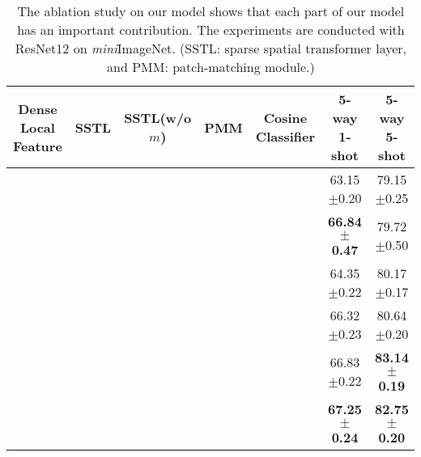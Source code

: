 \documentclass{SCIS2019}
\begin{document}
\begin{table}[t]
	\centering
	\caption{The ablation study on our model shows that each part of our model has an important contribution. The experiments are conducted with ResNet12 on \emph{mini}ImageNet. (SSTL: sparse spatial transformer layer, and PMM: patch-matching module.)}
	\begin{tabular*}{\hsize}{@{}@{\extracolsep{\fill}}ccccccc@{}}
\toprule
			\label{ablation}
			Dense Local Feature&SSTL&SSTL(w/o $m$)&PMM& Cosine Classifier
			&5-way 1-shot & 5-way 5-shot\\
			\midrule	
			&\CheckmarkBold&&\CheckmarkBold&   & 63.15$\pm$\footnotesize{0.20} & 79.15$\pm$\footnotesize{0.25} \\
			\CheckmarkBold&&&\CheckmarkBold&   &\textbf{66.84$\pm$\footnotesize{0.47}}  & 79.72$\pm$\footnotesize{0.50} 	\\
			\CheckmarkBold&\CheckmarkBold&&& \CheckmarkBold  &64.35$\pm$\footnotesize{0.22} & 80.17$\pm$\footnotesize{0.17} \\
			\CheckmarkBold&\CheckmarkBold&\CheckmarkBold&&   	 &66.32$\pm$\footnotesize{0.23} &80.64$\pm$\footnotesize{0.20} \\
			\CheckmarkBold&\CheckmarkBold&&\CheckmarkBold&   	\CheckmarkBold &66.83$\pm$\footnotesize{0.22} &\textbf{83.14$\pm$\footnotesize{0.19}} \\
			\CheckmarkBold&\CheckmarkBold&&\CheckmarkBold&   	 &\textbf{67.25$\pm$\footnotesize{0.24}} &\textbf{82.75$\pm$\footnotesize{0.20}} \\
			\bottomrule
		\end{tabular*}
	\end{table}
\end{document}
